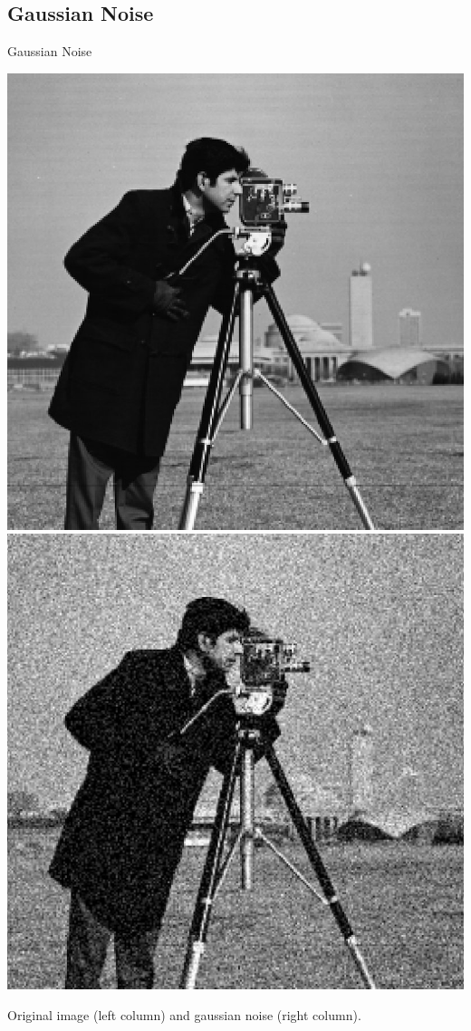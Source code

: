 \documentclass{beamer}
\begin{document}
\subsection{Gaussian Noise}
\begin{frame}{Gaussian Noise}

\vspace{1cm}
\begin{center}

    
    \includegraphics[width=0.4\columnwidth]{images/salt_pepper_origin.jpg}
    \includegraphics[width=0.4\columnwidth]{images/gaussian_noise.jpg}
	
	Original image (left column) and gaussian noise (right column).
	


\end{center}
\end{frame}
\end{document}

